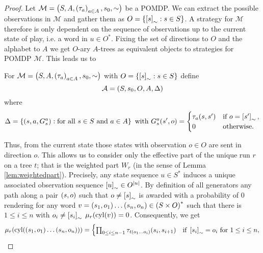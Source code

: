 \begin{proof}
  Let $\mathcal{M} = \left(S, A, \left(\tau_{a}\right)_{a\in A}, s_{0}, \sim\right)$ be a
  \ac{POMDP}. We can extract the possible observations in $\mathcal{M}$ and
  gather them as $O = \left\{\left[s\right]_{\sim}:s\in S\right\}$. A strategy for
  $\mathcal{M}$ therefore is only dependent on the sequence of observations up
  to the current state of play, i.e. a word in $u\in O^{*}$. Fixing the
  set of directions to $O$ and the alphabet to $A$ we get $O$-ary $A$-trees as
  equivalent objects to strategies for \ac{POMDP} $\mathcal{M}$. This leads us 
  to 
  \begin{definition}
    For $\mathcal{M} = \left(S, A, \left(\tau_{a}\right)_{a\in A}, s_{0}, \sim\right)$
    with $O = \left\{\left[s\right]_{\sim}: s\in S\right\}$ define
    \begin{equation*}
      \mathcal{A} = \left(S, s_{0}, O, A, \Delta\right)
    \end{equation*}
    where
    \begin{equation*}
      \Delta = \left\{
        \left(s, a, G_{s}^{a}\right):\text{for all }s\in S\text{ and }a\in A
      \right\}\text{ with }
      G_{s}^{a}(s', o) = \begin{cases}
        \tau_{a}(s, s')&\text{if }o = \left[s'\right]_{\sim},\\
        0              &\text{otherwise.}
      \end{cases}
    \end{equation*}
  \end{definition}
  Thus, from the current state those states with observation $o\in O$ are sent
  in direction $o$. This allows us to consider only the effective part of the 
  unique run $r$ on a tree $t$; that is the weighted part $W_{r}$ (in the sense
  of Lemma \ref{lem:weightedpart}). Precisely, any state sequence $u\in S^{*}$
  induces a unique associated observation sequence $\left[u\right]_{\sim}\in
  O^{\left\vert{u}\right\vert}$. By definition of all generators any path along a pair
  $\left(s, o\right)$ such that $o\neq\left[s\right]_{\sim}$ is awarded with a
  probability of $0$ rendering for any word
  $v = \left(s_{1}, o_{1}\right)\dots\left(s_{n}, o_{n}\right)\in\left(S\times O\right)^{*}$
  such that there is $1\leq i\leq n$ with $o_{i}\neq\left[s_{i}\right]_{\sim}$
  $\mu_{r}(\operatorname{cyl}(v)) = 0$. Consequently, we get
  \begin{equation}
    \mu_{r}(\operatorname{cyl}(\left(s_{1},o_{1}\right)\dots\left(s_{n},o_{n}\right))) =
    \begin{cases}
      \prod_{0\leq i\leq n-1}\tau_{t(o_{1}\dots o_{i})}(s_{i}, s_{i+1})
        &\text{if }\left[s_{i}\right]_{\sim} = o_{i}\text{ for }1\leq i\leq n,\\

\end{cases}
\end{equation}
\end{proof}
